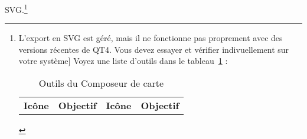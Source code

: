SVG.\footnote{L'export en SVG est g\'er\'e, mais il ne fonctionne pas proprement
avec des versions r\'ecentes de QT4. Vous devez essayer et v\'erifier
indivuellement sur votre syst\`eme] Voyez une liste d'outils dans le
tableau~\ref{tab:printcomposer_tools} :

\begin{table}[h]
\centering
\caption{Outils du Composeur de carte}\label{tab:printcomposer_tools}\medskip
 \begin{tabular}{|l|p{6.9cm}|l|p{6.9cm}|}
 \hline \textbf{Ic\^one} & \textbf{Objectif} & \textbf{Ic\^one} &
 \textbf{Objectif} \\
 

\end{tabular}
\end{table}}
